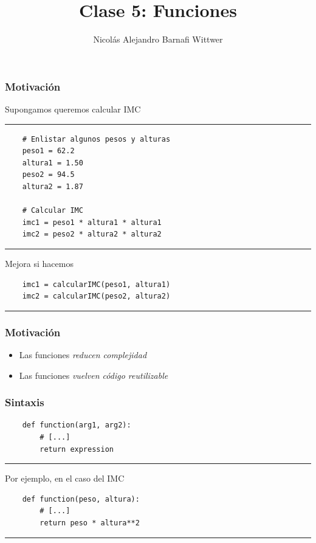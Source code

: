 \documentclass[14pt,aspectratio=169,xcolor=dvipsnames]{beamer}
\title[short title]{Clase 5: Funciones}
\subtitle{}
\author[NA Barnafi] {Nicolás Alejandro Barnafi Wittwer}
\institute[UC|CMM] 
{
    Pontificia Universidad Católica de Chile \\
    Centro de Modelamiento Matemático
}
\begin{document}
\begin{frame}
    \maketitle
\end{frame}
\begin{frame}[fragile]\frametitle{Motivación}
Supongamos queremos calcular IMC

\rule{\textwidth}{1pt}
\scriptsize
\begin{verbatim}
    # Enlistar algunos pesos y alturas
    peso1 = 62.2
    altura1 = 1.50
    peso2 = 94.5
    altura2 = 1.87
    
    # Calcular IMC
    imc1 = peso1 * altura1 * altura1
    imc2 = peso2 * altura2 * altura2
\end{verbatim}
\rule{\textwidth}{1pt}
\pause Mejora si hacemos
\begin{verbatim}
    imc1 = calcularIMC(peso1, altura1)
    imc2 = calcularIMC(peso2, altura2)
\end{verbatim}
\rule{\textwidth}{1pt}

\end{frame}
\begin{frame}\frametitle{Motivación}
    \begin{itemize}
        \item Las funciones \emph{reducen complejidad}
        \item Las funciones \emph{vuelven código reutilizable}
    \end{itemize}
\end{frame}
\begin{frame}[fragile]\frametitle{Sintaxis}

\begin{verbatim}
    def function(arg1, arg2):
        # [...]
        return expression
\end{verbatim}
\rule{\textwidth}{1pt}
Por ejemplo, en el caso del IMC
\begin{verbatim}
    def function(peso, altura):
        # [...]
        return peso * altura**2
\end{verbatim}
\rule{\textwidth}{1pt}
\end{frame}
\end{document}
